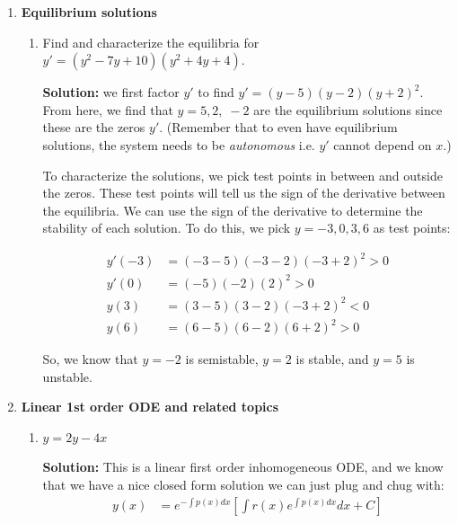 \documentclass[letterpaper, fontsize=12pt]{scrartcl} %
\numberwithin{equation}{section} %
\numberwithin{figure}{section} %
\numberwithin{table}{section} %
\begin{document}
\begin{enumerate}
\item \textbf{Equilibrium solutions} 
\begin{enumerate}[label = (\alph*)]
\item Find and characterize the equilibria for $y' = (y^2-7y + 10)(y^2 + 4y + 4)$. 

\par \textbf{Solution:} we first factor $y'$ to find $y' = (y-5)(y-2)(y+2)^2$. From here, we find that $y = 5, 2, \; -2$ are the equilibrium solutions since these are the zeros $y'$. (Remember that to even have equilibrium solutions, the system needs to be \textit{autonomous} i.e. $y'$ cannot depend on $x$.) 

\par To characterize the solutions, we pick test points in between and outside the zeros. These test points will tell us the sign of the derivative between the equilibria. We can use the sign of the derivative to determine the stability of each solution. To do this, we pick $ y = -3, 0, 3, 6$ as test points:

\begin{align*}
y'(-3) &= (-3 -5)(-3-2)(-3+2)^2 > 0 \\
y'(0) &= (-5)(-2)(2)^2 >0 \\
y(3) &= (3 -5)(3-2)(-3+2)^2 < 0 \\
y(6) &= (6 - 5)(6 - 2)(6 + 2)^2 > 0 
\end{align*}

So, we know that $y = -2$ is semistable, $y = 2$ is stable, and $y = 5$ is unstable. 

%


\end{enumerate}

\item \textbf{Linear 1st order ODE and related topics}
\begin{enumerate}[label = (\alph*)]
\item $y = 2y - 4x$

\par \textbf{Solution:} This is a linear first order inhomogeneous ODE, and we know that we have a nice closed form solution we can just plug and chug with:
\begin{align*}
y(x) &= e^{-\int p(x) dx} \left[ \int r(x) e^{\int p(x) dx} dx + C\right]
\end{align*}


\end{enumerate}
\end{enumerate}
\end{document}
